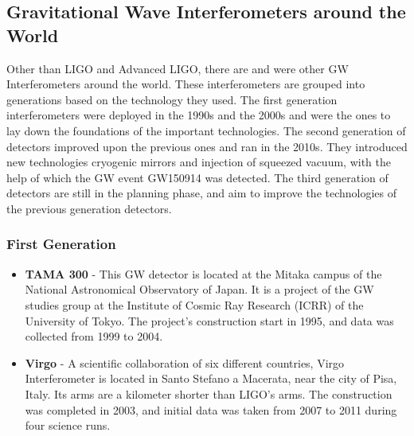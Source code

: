 \subsection{Gravitational Wave Interferometers around the World}
Other than LIGO and Advanced LIGO, there are and were other GW Interferometers around the world. These interferometers are grouped into generations based on the technology they used. The first generation interferometers were deployed in the 1990s and the 2000s and were the ones to lay down the foundations of the important technologies. The second generation of detectors improved upon the previous ones and ran in the 2010s. They introduced new technologies cryogenic mirrors and injection of squeezed vacuum, with the help of which the GW event GW150914 was detected. The third generation of detectors are still in the planning phase, and aim to improve the technologies of the previous generation detectors. \cite{GWO}

\subsubsection{First Generation}
\begin{itemize}
\item \textbf{TAMA 300} - This GW detector is located at the Mitaka campus of the National Astronomical Observatory of Japan. It is a project of the GW studies group at the Institute of Cosmic Ray Research (ICRR) of the University of Tokyo. The project's construction start in 1995, and data was collected from 1999 to 2004. \cite{TAMA_300}

\item \textbf{Virgo} - A scientific collaboration of six different countries, Virgo Interferometer is located in Santo Stefano a Macerata, near the city of Pisa, Italy. Its arms are a kilometer shorter than LIGO's arms. The construction was completed in 2003, and initial data was taken from 2007 to 2011 during four science runs. \cite{Virgo}
\end{itemize}

